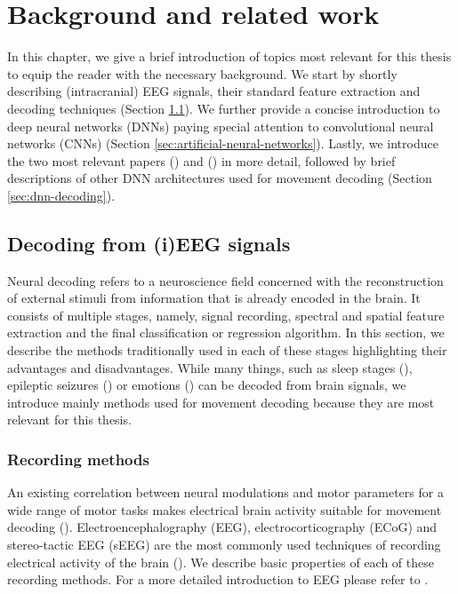 \chapter{Background and related work}
\label{chap:background}
In this chapter, we give a brief introduction of topics most relevant for this thesis to equip the reader with the necessary background.
We start by shortly describing (intracranial) EEG signals, their standard feature extraction and decoding techniques (Section \ref{sec:decoding-from-ieeg}). We further provide a concise introduction to deep neural networks (DNNs) paying special attention to convolutional neural networks (CNNs) (Section \ref{sec:artificial-neural-networks}).
Lastly, we introduce the two most relevant papers (\cite{Hammer-2021}) and (\cite{schirrmeister-deep-2017}) in more detail, followed by brief descriptions of other DNN architectures used for movement decoding (Section \ref{sec:dnn-decoding}).

\section{Decoding from (i)EEG signals}
\label{sec:decoding-from-ieeg}
Neural decoding refers to a neuroscience field concerned with the reconstruction of external stimuli from information that is already encoded in the brain. 
It consists of multiple stages, namely, signal recording, spectral and spatial feature extraction and the final classification or regression algorithm. 
In this section, we describe the methods traditionally used in each of these stages highlighting their advantages and disadvantages. 
While many things, such as sleep stages (\cite{sleep-eegnet}), epileptic seizures (\cite{epileptic-seizures-eeg}) or emotions (\cite{emotion-eeg}) can be decoded from brain signals, we introduce mainly methods used for movement decoding because they are most relevant for this thesis. 

\subsection{Recording methods}
An existing correlation between neural modulations and motor parameters for a wide range of motor tasks makes electrical brain activity suitable for movement decoding  (\cite{lebedev-cortical-2005}).
Electroencephalography (EEG), electrocorticography (ECoG) and stereo-tactic EEG (sEEG) are the most commonly used techniques of recording electrical activity of the brain (\cite{tam-human-2019}).
We describe basic properties of each of these recording methods. For a more detailed introduction to EEG please refer to \cite{NiedermeyersElectroencephalography}.

